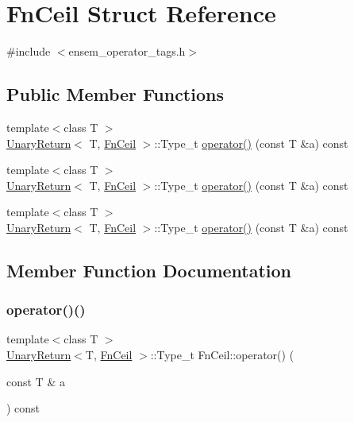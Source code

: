 \hypertarget{structFnCeil}{}\section{Fn\+Ceil Struct Reference}
\label{structFnCeil}


{\ttfamily \#include $<$ensem\+\_\+operator\+\_\+tags.\+h$>$}

\subsection*{Public Member Functions}
\begin{DoxyCompactItemize}
\item 
{\footnotesize template$<$class T $>$ }\\\mbox{\hyperlink{structUnaryReturn}{Unary\+Return}}$<$ T, \mbox{\hyperlink{structFnCeil}{Fn\+Ceil}} $>$\+::Type\+\_\+t \mbox{\hyperlink{structFnCeil_a9588c4122c2bacfe31df3cf25cb9d172}{operator()}} (const T \&a) const
\item 
{\footnotesize template$<$class T $>$ }\\\mbox{\hyperlink{structUnaryReturn}{Unary\+Return}}$<$ T, \mbox{\hyperlink{structFnCeil}{Fn\+Ceil}} $>$\+::Type\+\_\+t \mbox{\hyperlink{structFnCeil_a9588c4122c2bacfe31df3cf25cb9d172}{operator()}} (const T \&a) const
\item 
{\footnotesize template$<$class T $>$ }\\\mbox{\hyperlink{structUnaryReturn}{Unary\+Return}}$<$ T, \mbox{\hyperlink{structFnCeil}{Fn\+Ceil}} $>$\+::Type\+\_\+t \mbox{\hyperlink{structFnCeil_a9588c4122c2bacfe31df3cf25cb9d172}{operator()}} (const T \&a) const
\end{DoxyCompactItemize}


\subsection{Member Function Documentation}
\mbox{\label{structFnCeil_a9588c4122c2bacfe31df3cf25cb9d172}} 
\subsubsection{\texorpdfstring{operator()()}{operator()()}\hspace{0.1cm}{\footnotesize\ttfamily [1/3]}}
{\footnotesize\ttfamily template$<$class T $>$ \\
\mbox{\hyperlink{structUnaryReturn}{Unary\+Return}}$<$T, \mbox{\hyperlink{structFnCeil}{Fn\+Ceil}} $>$\+::Type\+\_\+t Fn\+Ceil\+::operator() (\begin{DoxyParamCaption}\item[{const T \&}]{a }\end{DoxyParamCaption}) const\hspace{0.3cm}{\ttfamily [inline]}}

